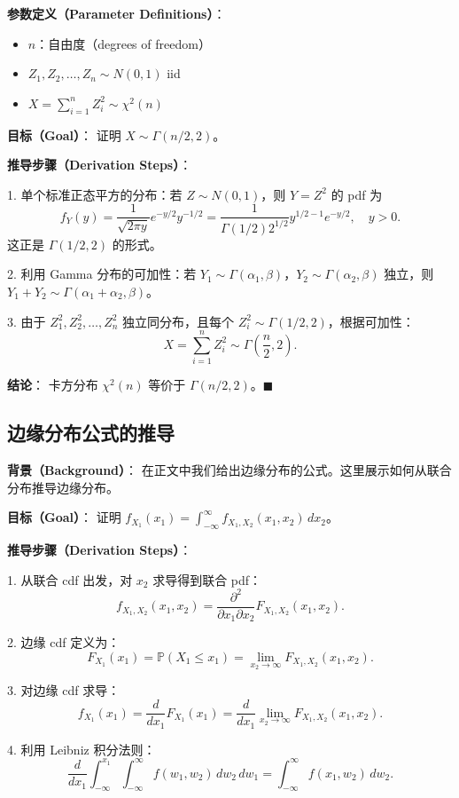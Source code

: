 \textbf{参数定义（Parameter Definitions）}：
\begin{itemize}
\item $n$：自由度（degrees of freedom）
\item $Z_1, Z_2, \ldots, Z_n \sim N(0,1)$ iid
\item $X = \sum_{i=1}^{n} Z_i^2 \sim \chi^2(n)$
\end{itemize}

\textbf{目标（Goal）}：
证明 $X \sim \Gamma(n/2, 2)$。

\textbf{推导步骤（Derivation Steps）}：

1. 单个标准正态平方的分布：若 $Z \sim N(0,1)$，则 $Y = Z^2$ 的 pdf 为
\[
f_Y(y) = \frac{1}{\sqrt{2\pi y}} e^{-y/2} y^{-1/2} = \frac{1}{\Gamma(1/2) 2^{1/2}} y^{1/2 - 1} e^{-y/2}, \quad y > 0.
\]
这正是 $\Gamma(1/2, 2)$ 的形式。

2. 利用 Gamma 分布的可加性：若 $Y_1 \sim \Gamma(\alpha_1, \beta)$，$Y_2 \sim \Gamma(\alpha_2, \beta)$ 独立，则 $Y_1 + Y_2 \sim \Gamma(\alpha_1 + \alpha_2, \beta)$。

3. 由于 $Z_1^2, Z_2^2, \ldots, Z_n^2$ 独立同分布，且每个 $Z_i^2 \sim \Gamma(1/2, 2)$，根据可加性：
\[
X = \sum_{i=1}^{n} Z_i^2 \sim \Gamma\left(\frac{n}{2}, 2\right).
\]

\textbf{结论}：
卡方分布 $\chi^2(n)$ 等价于 $\Gamma(n/2, 2)$。$\blacksquare$

\subsection{边缘分布公式的推导}\label{sec:derivation-marginal-distributions}

\textbf{背景（Background）}：
在正文中我们给出边缘分布的公式。这里展示如何从联合分布推导边缘分布。

\textbf{目标（Goal）}：
证明 $f_{X_1}(x_1) = \int_{-\infty}^{\infty} f_{X_1, X_2}(x_1, x_2) \, dx_2$。

\textbf{推导步骤（Derivation Steps）}：

1. 从联合 cdf 出发，对 $x_2$ 求导得到联合 pdf：
\[
f_{X_1, X_2}(x_1, x_2) = \frac{\partial^2}{\partial x_1 \partial x_2} F_{X_1, X_2}(x_1, x_2).
\]

2. 边缘 cdf 定义为：
\[
F_{X_1}(x_1) = \mathbb{P}(X_1 \leq x_1) = \lim_{x_2 \to \infty} F_{X_1, X_2}(x_1, x_2).
\]

3. 对边缘 cdf 求导：
\[
f_{X_1}(x_1) = \frac{d}{dx_1} F_{X_1}(x_1) = \frac{d}{dx_1} \lim_{x_2 \to \infty} F_{X_1, X_2}(x_1, x_2).
\]

4. 利用 Leibniz 积分法则：
\[
\frac{d}{dx_1} \int_{-\infty}^{x_1} \int_{-\infty}^{\infty} f(w_1, w_2) \, dw_2 \, dw_1 = \int_{-\infty}^{\infty} f(x_1, w_2) \, dw_2.
\]

